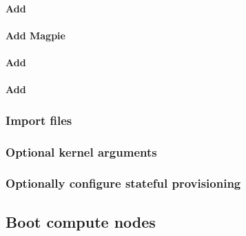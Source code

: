 \documentclass[letterpaper]{article}
\begin{document}
\paragraph{Add \genders{}}


\paragraph{Add Magpie}


\paragraph{Add \conman{}} \label{sec:add_conman}


\paragraph{Add \nhc{}} \label{sec:add_nhc}



\subsubsection{Import files} \label{sec:file_import}








\subsubsection{Optional kernel arguments} \label{sec:optional_kargs}




\vspace*{-0.1cm}
\subsubsection{Optionally configure stateful provisioning}


\subsection{Boot compute nodes} \label{sec:boot_computes}
 
\end{document}
